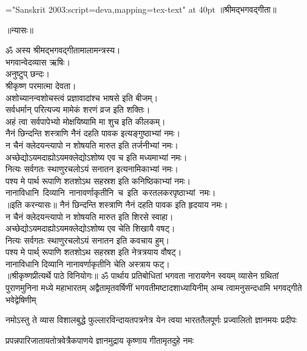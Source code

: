 \large
\centerline{\font\x="Sanskrit 2003:script=deva,mapping=tex-text" at 40pt \x ॥श्रीमद्भगवद्गीता॥}
\bigskip
\centerline{\Large ॥न्यासः॥}
\medskip
{}
ॐ अस्य श्रीमद्‌भगवद्‌गीतामालामन्त्रस्य।\\ 
भगवान्वेदव्यास ऋषिः।\\
अनुष्टुप्‌ छन्दः।\\
श्रीकृष्ण परमात्मा देवता।\\
अशोच्यानन्वशोचस्त्वं प्रज्ञावादांश्च भाषसे इति बीजम्‌।\\
सर्वधर्मान्‌ परित्यज्य मामेकं शरणं व्रज इति शक्तिः।\\
अहं त्वा सर्वपापेभ्यो मोक्षयिष्यामि मा शुच इति कीलकम्‌।\\
नैनं छिन्दन्ति शस्त्राणि नैनं दहति पावक इत्यङ्गुष्ठाभ्यां नमः।\\
न चैनं क्लेदयन्त्यापो न शोषयति मारुत इति तर्जनीभ्यां नमः।\\
अच्छेद्योऽयमदाह्योऽयमक्लेद्योऽशोष्य एव च इति मध्यमाभ्यां नमः।\\
नित्यः सर्वगतः स्थाणुरचलोऽयं सनातन इत्यनामिकाभ्यां नमः।\\
पश्य मे पार्थ रूपाणि शतशोऽथ सहस्रश इति कनिष्ठिकाभ्यां नमः।\\
नानाविधानि~दिव्यानि~नानावर्णाकृतीनि~च~इति~करतलकरपृष्ठाभ्यां~नमः।\\
{॥इति करन्यासः॥}
\medskip
\newpage
{}
नैनं छिन्दन्ति शस्त्राणि नैनं दहति पावक इति हृदयाय नमः।\\
न चैनं क्लेदयन्त्यापो न शोषयति मारुत इति शिरसे स्वाहा।\\
अच्छेद्योऽयमदाह्योऽयमक्लेद्योऽशोष्य एव चेति शिखायै वषट्‌।\\
नित्यः सर्वगतः स्थाणुरचलोऽयं सनातन इति कवचाय हुम्‌।\\
पश्य मे पार्थ् रूपाणि शतशोऽथ सहस्रश इति नेत्रत्रयाय वौषट्‌।\\
नानाविधानि दिव्यानि नानावर्णाकृतीनि चेति अस्त्राय फट्‌।\\
{॥श्रीकृष्णप्रीत्यर्थे पाठे विनियोगः॥}
{}
\fourlineindentedshloka
{ॐ पार्थाय प्रतिबोधितां भगवता नारायणेन स्वयम्}
{व्यासेन ग्रथितां पुराणमुनिना मध्ये महाभारतम्}
{अद्वैतामृतवर्षिणीं भगवतीमष्टादशाध्यायिनीम्}
{अम्ब त्वामनुसन्दधामि भगवद्गीते भवेद्वेषिणीम्}%

\twolineshloka
{नमोऽस्तु ते व्यास विशालबुद्धे फुल्लारविन्दायतपत्रनेत्र}
{येन त्वया भारततैलपूर्णः प्रज्वालितो ज्ञानमयः प्रदीपः}%

\twolineshloka
{प्रपन्नपारिजातायतोत्रवेत्रैकपाणये}
{ज्ञानमुद्राय कृष्णाय गीतामृतदुहे नमः}%

